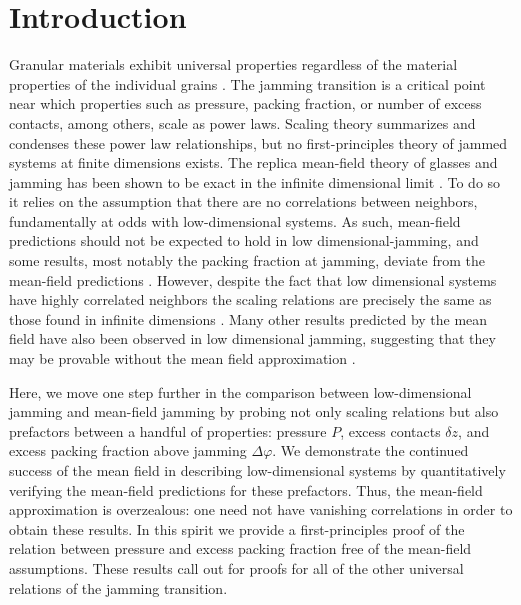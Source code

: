 \section{Introduction}
Granular materials exhibit universal properties regardless of the material properties of the individual grains \cite{liu_jamming_2010,charbonneau_universal_2012,charbonneau_glass_2017}.  The jamming transition is a critical point near which properties such as pressure, packing fraction, or number of excess contacts, among others, scale as power laws.  Scaling theory summarizes and condenses these power law relationships, but no first-principles theory of jammed systems at finite dimensions exists.  The replica mean-field theory of glasses and jamming has been shown to be exact in the infinite dimensional limit \cite{parisi_mean-field_2010,parisi_theory_2020}.  To do so it relies on the assumption that there are no correlations between neighbors, fundamentally at odds with low-dimensional systems. As such, mean-field predictions should not be expected to hold in low dimensional-jamming, and some results, most notably the packing fraction at jamming, deviate from the mean-field predictions \cite{charbonneau_universal_2012,parisi_robustness_2018}. However, despite the fact that low dimensional systems have highly correlated neighbors the scaling relations are precisely the same as those found in infinite dimensions \cite{ohern_jamming_2003, ohern_random_2002, goodrich_scaling_2016}. Many other results predicted by the mean field have also been observed in low dimensional jamming, suggesting that they may be provable without the mean field approximation \cite{charbonneau_universal_2012,charbonneau_universal_2016, berthier_perspective_2019,
charbonneau_glass_2017, dennis_jamming_2020,arceri_vibrational_2019}.

Here, we move one step further in the comparison between low-dimensional jamming and mean-field jamming by probing not only scaling relations but also prefactors between a handful of properties: pressure $P$, excess contacts $\delta z$, and excess packing fraction above jamming $\Delta \varphi$. We demonstrate the continued success of the mean field in describing low-dimensional systems by quantitatively verifying the mean-field predictions for these prefactors. Thus, the mean-field approximation is overzealous: one need not have vanishing correlations in order to obtain these results. In this spirit we provide a first-principles proof of the relation between pressure and excess packing fraction free of the mean-field assumptions.  These results call out for proofs for all of the other universal relations of the jamming transition.

